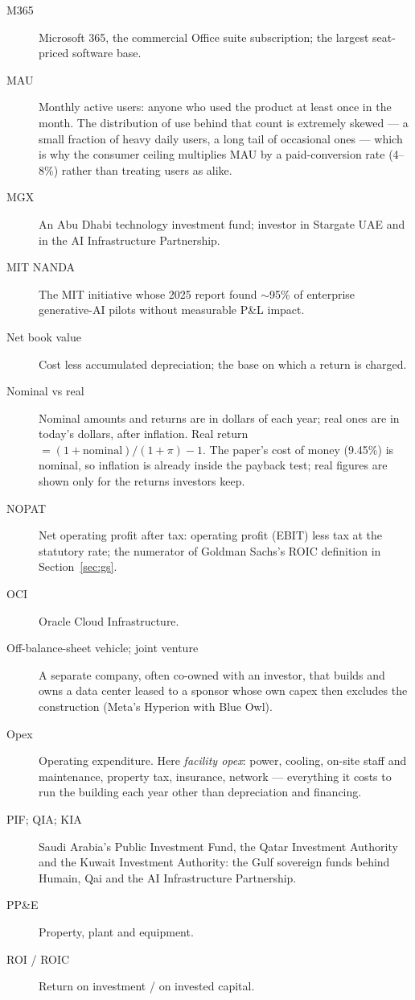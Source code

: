 \documentclass[11pt,letterpaper]{article}
\begin{document}
\begin{description}
\item[M365] Microsoft 365, the commercial Office suite subscription; the largest seat-priced software base.
\item[MAU] Monthly active users: anyone who used the product at least once in the month. The distribution of use behind that count is extremely skewed --- a small fraction of heavy daily users, a long tail of occasional ones --- which is why the consumer ceiling multiplies MAU by a paid-conversion rate (4--8\%) rather than treating users as alike.
\item[MGX] An Abu Dhabi technology investment fund; investor in Stargate UAE and in the AI Infrastructure Partnership.
\item[MIT NANDA] The MIT initiative whose 2025 report found $\sim$95\% of enterprise generative-AI pilots without measurable P\&L impact.
\item[Net book value] Cost less accumulated depreciation; the base on which a return is charged.
\item[Nominal vs real] Nominal amounts and returns are in dollars of each year; real ones are in today's dollars, after inflation. Real return $=(1+\text{nominal})/(1+\pi)-1$. The paper's cost of money (9.45\%) is nominal, so inflation is already inside the payback test; real figures are shown only for the returns investors keep.
\item[NOPAT] Net operating profit after tax: operating profit (EBIT) less tax at the statutory rate; the numerator of Goldman Sachs's ROIC definition in Section~\ref{sec:gs}.
\item[OCI] Oracle Cloud Infrastructure.
\item[Off-balance-sheet vehicle; joint venture] A separate company, often co-owned with an investor, that builds and owns a data center leased to a sponsor whose own capex then excludes the construction (Meta's Hyperion with Blue Owl).
\item[Opex] Operating expenditure. Here \emph{facility opex}: power, cooling, on-site staff and maintenance, property tax, insurance, network --- everything it costs to run the building each year other than depreciation and financing.
\item[PIF; QIA; KIA] Saudi Arabia's Public Investment Fund, the Qatar Investment Authority and the Kuwait Investment Authority: the Gulf sovereign funds behind Humain, Qai and the AI Infrastructure Partnership.
\item[PP\&E] Property, plant and equipment.
\item[ROI / ROIC] Return on investment / on invested capital.

\end{description}
\end{document}
